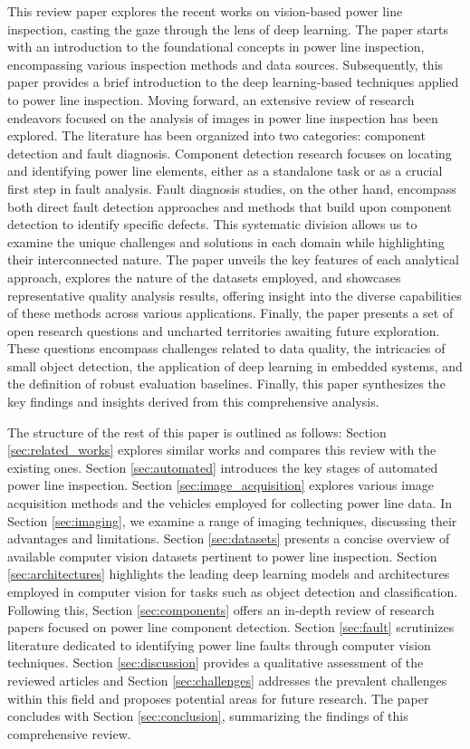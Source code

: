 This review paper explores the recent works on vision-based power line inspection, casting the gaze through the lens of deep learning. The paper starts with an introduction to the foundational concepts in power line inspection, encompassing various inspection methods and data sources. Subsequently, this paper provides a brief introduction to the deep learning-based techniques applied to power line inspection. Moving forward, an extensive review of research endeavors focused on the analysis of images in power line inspection has been explored. 
The literature has been organized into two categories: component detection and fault diagnosis. Component detection research focuses on locating and identifying power line elements, either as a standalone task or as a crucial first step in fault analysis. Fault diagnosis studies, on the other hand, encompass both direct fault detection approaches and methods that build upon component detection to identify specific defects. This systematic division allows us to examine the unique challenges and solutions in each domain while highlighting their interconnected nature.
The paper unveils the key features of each analytical approach, explores the nature of the datasets employed, and showcases representative quality analysis results, offering insight into the diverse capabilities of these methods across various applications. Finally, the paper presents a set of open research questions and uncharted territories awaiting future exploration. These questions encompass challenges related to data quality, the intricacies of small object detection, the application of deep learning in embedded systems, and the definition of robust evaluation baselines. Finally, this paper synthesizes the key findings and insights derived from this comprehensive analysis.

The structure of the rest of this paper is outlined as follows: Section \ref{sec:related_works} explores similar works and compares this review with the existing ones. Section \ref{sec:automated} introduces the key stages of automated power line inspection. Section \ref{sec:image_acquisition} explores various image acquisition methods and the vehicles employed for collecting power line data. In Section \ref{sec:imaging}, we examine a range of imaging techniques, discussing their advantages and limitations. Section \ref{sec:datasets} presents a concise overview of available computer vision datasets pertinent to power line inspection. Section \ref{sec:architectures} highlights the leading deep learning models and architectures employed in computer vision for tasks such as object detection and classification. Following this, Section \ref{sec:components} offers an in-depth review of research papers focused on power line component detection. Section \ref{sec:fault} scrutinizes literature dedicated to identifying power line faults through computer vision techniques. Section \ref{sec:discussion} provides a qualitative assessment of the reviewed articles and Section \ref{sec:challenges} addresses the prevalent challenges within this field and proposes potential areas for future research. The paper concludes with Section \ref{sec:conclusion}, summarizing the findings of this comprehensive review. 